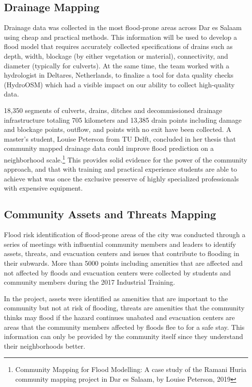 \documentclass[a4paper,12pt,twoside]{article}
\begin{document}
\subsection{Drainage Mapping}

Drainage data was collected in the most flood-prone areas across Dar es Salaam using cheap and practical methods. This information will be used to develop a flood model that requires accurately collected specifications of drains such as depth, width, blockage (by either vegetation or material), connectivity, and diameter (typically for culverts). At the same time, the team worked with a hydrologist in Deltares, Netherlands, to finalize a tool for data quality checks (HydroOSM) which had a visible impact on our ability to collect high-quality data. 

18,350 segments of culverts, drains, ditches and decommissioned drainage infrastructure totaling 705 kilometers and 13,385 drain points including damage and blockage points, outflow, and points with no exit have been collected. A master’s student, Louise Peterson from TU Delft, concluded in her thesis that community mapped drainage data could improve flood prediction on a neighborhood scale.\footnote{ Community Mapping for Flood Modelling: A case study of the Ramani Huria community mapping project in Dar es Salaam, by Louise Peterson, 2019} This provides solid evidence for the power of the community approach, and that with training and practical experience students are able to achieve what was once the exclusive preserve of highly specialized professionals with expensive equipment. 


\subsection{Community Assets and Threats Mapping}

Flood risk identification of flood-prone areas of the city was conducted through a series of meetings with influential community members and leaders to identify assets, threats, and evacuation centers and issues that contribute to flooding in their subwards. More than 5000 points including amenities that are affected and not affected by floods and evacuation centers were collected by students and community members during the 2017 Industrial Training.

In the project, assets were identified as amenities that are important to the community but not at risk of flooding, threats are amenities that the community thinks may flood if the hazard continues unabated and evacuation centers are areas that the community members affected by floods flee to for a safe stay. This information can only be provided by the community itself since they understand their neighborhoods better.
\end{document}
